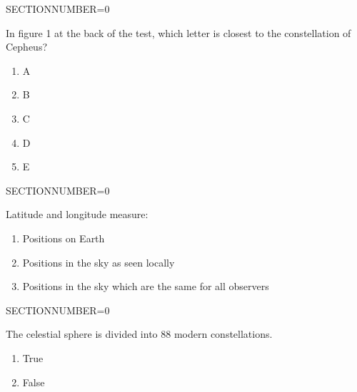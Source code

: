 \documentclass[11pt]{article}
\begin{document}
\begin{enumerate}
\begin{minipage}{\textwidth}
\begin{minipage}{\textwidth}
\end{minipage}
SECTIONNUMBER=0
\end{minipage}
\vskip 0.20in

\begin{minipage}{\textwidth}
\begin{minipage}{\textwidth}
\item In figure 1 at the back of the test, which letter is closest to the constellation of Cepheus?
\begin{multicols}{3}
\begin{enumerate} 
\setlength{\itemsep}{1pt} 
\setlength{\parskip}{0pt} 
\setlength{\parsep}{0pt}
\setlength{\multicolsep}{1pt} 
\item A
\item B
\item C
\item D
\item E
\end{enumerate} 
\vfill 
\end{multicols}

\end{minipage}
SECTIONNUMBER=0
\end{minipage}
\vskip 0.20in

\begin{minipage}{\textwidth}
\begin{minipage}{\textwidth}
\item Latitude and longitude measure:
\begin{enumerate} 
\setlength{\itemsep}{1pt} 
\setlength{\parskip}{0pt} 
\setlength{\parsep}{0pt}
\setlength{\multicolsep}{1pt} 
\item Positions on Earth
\item Positions in the sky as seen locally
\item Positions in the sky which are the same for all observers
\end{enumerate} 
\end{minipage}
SECTIONNUMBER=0
\end{minipage}
\vskip 0.20in

\begin{minipage}{\textwidth}
\begin{minipage}{\textwidth}
\item The celestial sphere is divided into 88 modern constellations.
\begin{multicols}{3}
\begin{enumerate} 
\setlength{\itemsep}{1pt} 
\setlength{\parskip}{0pt} 
\setlength{\parsep}{0pt}
\setlength{\multicolsep}{1pt} 
\item True
\item False
\end{enumerate} 
\vfill 
\end{multicols}


\end{minipage}
\end{minipage}
\end{enumerate}
\end{document}
